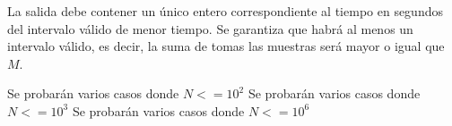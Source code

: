 \documentclass{oci}
\begin{document}
\begin{outputDescription}
  La salida debe contener un único entero correspondiente al tiempo en segundos
  del intervalo válido de menor tiempo.
  Se garantiza que habrá al menos un intervalo válido, es decir, la suma de
  tomas las muestras será mayor o igual que $M$.
\end{outputDescription}

\begin{scoreDescription}
   Se probarán varios casos donde $N<=10^2$
   Se probarán varios casos donde $N<=10^3$
   Se probarán varios casos donde $N<=10^6$
\end{scoreDescription}

\begin{sampleDescription}
\end{sampleDescription}
\end{document}
